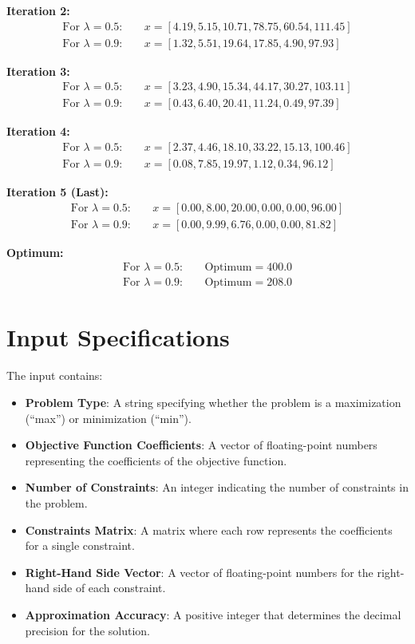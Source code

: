 \documentclass[12pt, legalpaper]{exam}
\begin{document}
\textbf{Iteration 2:}
\begin{align*}
    \text{For } \lambda = 0.5: & \quad x = [ 4.19, 5.15, 10.71, 78.75, 60.54, 111.45 ] \\
    \text{For } \lambda = 0.9: & \quad x = [ 1.32, 5.51, 19.64, 17.85, 4.90, 97.93 ]
\end{align*}

\textbf{Iteration 3:}
\begin{align*}
    \text{For } \lambda = 0.5: & \quad x = [ 3.23, 4.90, 15.34, 44.17, 30.27, 103.11 ] \\
    \text{For } \lambda = 0.9: & \quad x = [ 0.43, 6.40, 20.41, 11.24, 0.49, 97.39 ]
\end{align*}

\textbf{Iteration 4:}
\begin{align*}
    \text{For } \lambda = 0.5: & \quad x = [ 2.37, 4.46, 18.10, 33.22, 15.13, 100.46 ] \\
    \text{For } \lambda = 0.9: & \quad x = [ 0.08, 7.85, 19.97, 1.12, 0.34, 96.12 ]
\end{align*}

\textbf{Iteration 5 (Last):}
\begin{align*}
    \text{For } \lambda = 0.5: & \quad x = [ 0.00, 8.00, 20.00, 0.00, 0.00, 96.00 ] \\
    \text{For } \lambda = 0.9: & \quad x = [ 0.00, 9.99, 6.76, 0.00, 0.00, 81.82 ]
\end{align*}

\textbf{Optimum:}
\begin{align*}
    \text{For } \lambda = 0.5: & \quad \text{Optimum} = 400.0 \\
    \text{For } \lambda = 0.9: & \quad \text{Optimum} = 208.0
\end{align*}

\newpage
\vspace{12pt}

\section*{Input Specifications}

The input contains:
\begin{itemize}
    \item \textbf{Problem Type}: A string specifying whether the problem is a maximization (``max'') or minimization (``min'').
    \item \textbf{Objective Function Coefficients}: A vector of floating-point numbers representing the coefficients of the objective function.
    \item \textbf{Number of Constraints}: An integer indicating the number of constraints in the problem.
    \item \textbf{Constraints Matrix}: A matrix where each row represents the coefficients for a single constraint.
    \item \textbf{Right-Hand Side Vector}: A vector of floating-point numbers for the right-hand side of each constraint.
    \item \textbf{Approximation Accuracy}: A positive integer that determines the decimal precision for the solution.
\end{itemize}
\end{document}
